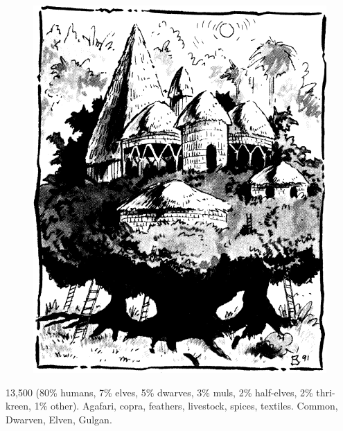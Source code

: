 \begin{figure}[t!]
\centering
\includegraphics[width=\columnwidth]{images/gulg-1.png}
\WOTC
\end{figure}
{13,500 (80\% humans, 7\% elves, 5\% dwarves, 3\% muls, 2\% half-elves, 2\% thri-kreen, 1\% other).}
{Agafari, copra, feathers, livestock, spices, textiles.}
{Common, Dwarven, Elven, Gulgan.}
